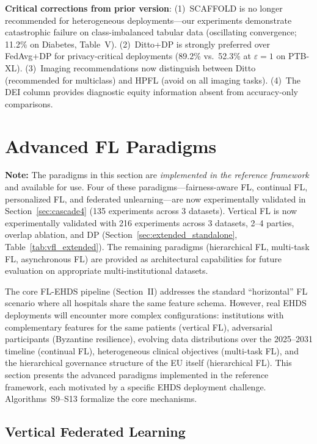 \documentclass[conference,a4paper]{IEEEtran}
\begin{document}
\textbf{Critical corrections from prior version}: (1)~SCAFFOLD is no longer recommended for heterogeneous deployments---our experiments demonstrate catastrophic failure on class-imbalanced tabular data (oscillating convergence; 11.2\% on Diabetes, Table~V). (2)~Ditto+DP is strongly preferred over FedAvg+DP for privacy-critical deployments (89.2\% vs.\ 52.3\% at $\varepsilon{=}1$ on PTB-XL). (3)~Imaging recommendations now distinguish between Ditto (recommended for multiclass) and HPFL (avoid on all imaging tasks). (4)~The DEI column provides diagnostic equity information absent from accuracy-only comparisons.

\section{Advanced FL Paradigms}
\label{sec:advanced}

\textbf{Note:} The paradigms in this section are \textit{implemented in the reference framework} and available for use. Four of these paradigms---fairness-aware FL, continual FL, personalized FL, and federated unlearning---are now experimentally validated in Section~\ref{sec:cascade4} (135 experiments across 3 datasets). Vertical FL is now experimentally validated with 216 experiments across 3 datasets, 2--4 parties, overlap ablation, and DP (Section~\ref{sec:extended_standalone}, Table~\ref{tab:vfl_extended}). The remaining paradigms (hierarchical FL, multi-task FL, asynchronous FL) are provided as architectural capabilities for future evaluation on appropriate multi-institutional datasets.

The core FL-EHDS pipeline (Section~II) addresses the standard ``horizontal'' FL scenario where all hospitals share the same feature schema. However, real EHDS deployments will encounter more complex configurations: institutions with complementary features for the same patients (vertical FL), adversarial participants (Byzantine resilience), evolving data distributions over the 2025--2031 timeline (continual FL), heterogeneous clinical objectives (multi-task FL), and the hierarchical governance structure of the EU itself (hierarchical FL). This section presents the advanced paradigms implemented in the reference framework, each motivated by a specific EHDS deployment challenge. Algorithms~S9--S13 formalize the core mechanisms.

\subsection{Vertical Federated Learning}
\end{document}
